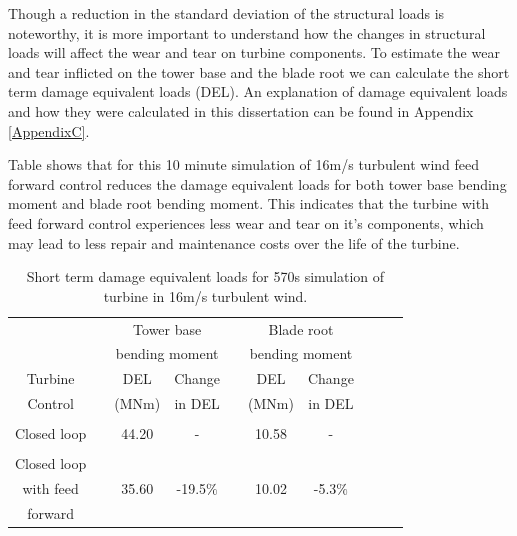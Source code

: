 Though a reduction in the standard deviation of the structural loads is noteworthy, it is more important to understand how the changes in structural loads will affect the wear and tear on turbine components. To estimate the wear and tear inflicted on the tower base and the blade root we can calculate the short term damage equivalent loads (DEL). An explanation of damage equivalent loads and how they were calculated in this dissertation can be found in Appendix \ref{AppendixC}. 

Table shows that for this 10 minute simulation of 16m/s turbulent wind feed forward control reduces the damage equivalent loads for both tower base bending moment and blade root bending moment. This indicates that the turbine with feed forward control experiences less wear and tear on it's components, which may lead to less repair and maintenance costs over the life of the turbine.


\begin{table}
\caption{Short term damage equivalent loads for 570s simulation of turbine  in 16m/s turbulent wind.}
\centering
\begin{tabular}{ c | c c c c c c c c c}
\hline
\hline
					&&\multicolumn{2}{c}{Tower base}					&&\multicolumn{2}{c}{Blade	root} \\
					&&\multicolumn{2}{c}{bending moment}			&&\multicolumn{2}{c}{bending moment}\\
						\cline{3-4} 														\cline{6-7}
Turbine			&& DEL   	& Change										&& DEL  	& Change\\
Control			&& (MNm)  & in DEL 										&& (MNm)  & in DEL 	\\
\hline
\\
Closed loop  && 44.20 & - 													&& 10.58 & - \\
 \\
Closed loop\\
with feed  		&& 35.60 & -19.5$\%$ 									&& 10.02 & -5.3$\%$\\
forward\\
\hline
\hline
\end{tabular}
\label{Table3-3}
\end{table}


